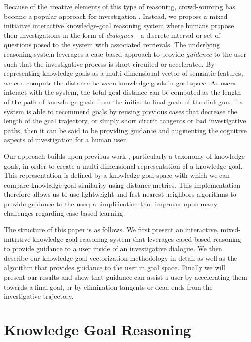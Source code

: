 \documentclass[letterpaper]{article}
\begin{document}
Because of the creative elements of this type of reasoning, crowd-sourcing has become a popular approach for investigation \cite{wang_wisdom_2013}. Instead, we propose a mixed-initiaitve interactive knowledge-goal reasoning system where humans propose their investigations in the form of \textit{dialogues} -- a discrete interval or set of questions posed to the system with associated retrievals. The underlying reasoning system leverages a case based approach to provide \textit{guidance} to the user such that the investigative process is short circuited or accelerated. By representing knowledge goals as a multi-dimensional vector of semantic features, we can compute the distance between knowledge goals in goal space. As users interact with the system, the total goal distance can be computed as the length of the path of knowledge goals from the initial to final goals of the dialogue. If a system is able to recommend goals by reusing previous cases that decrease the length of the goal trajectory, or simply short circuit tangents or bad investigative paths, then it can be said to be providing guidance and augmenting the cognitive aspects of investigation for a human user.

Our approach builds upon previous work \cite{bengfort_interactive_2015}, particularly a taxonomy of knowledge goals, in order to create a multi-dimensional representation of a knowledge goal. This representation is defined by a knowledge goal space with which we can compare knowledge goal similarity using distance metrics. This implementation therefore allows us to use lightweight and fast nearest neighbors algorithms to provide guidance to the user; a simplification that improves upon many challenges regarding case-based learning.

The structure of this paper is as follows. We first present an interactive, mixed-initiative knowledge goal reasoning system that leverages cased-based reasoning to provide guidance to a user inside of an investigative dialogue. We then describe our knowledge goal vectorization methodology in detail as well as the algorithm that provides guidance to the user in goal space. Finally we will present our results and show that guidance can assist a user by accelerating them towards a final goal, or by elimination tangents or dead ends from the investigative trajectory.

\section{Knowledge Goal Reasoning}
\end{document}

